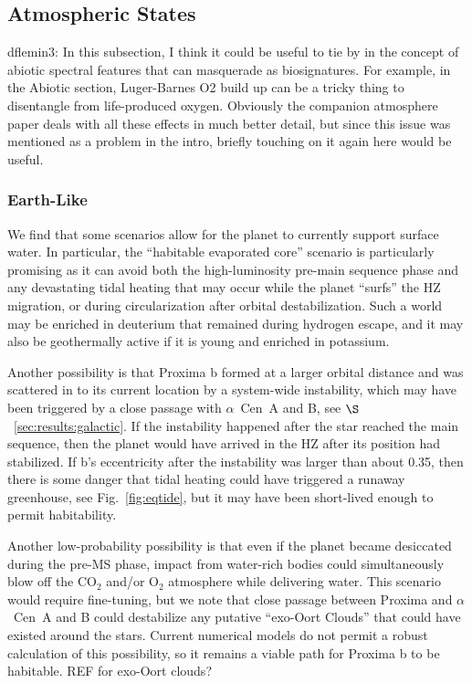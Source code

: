 \documentclass[preprint,12pt]{aastex}
\newcommand{\xxx}[1]{{\color{red} #1}} %
\newcommand{\xxx}[1]{{\color{red} #1}} %
\def\acen{{$\alpha$~Cen}}
\begin{document}
\subsection{Atmospheric States}
\label{sec:results:atmstates}

\xxx{dflemin3:  In this subsection, I think it could be useful to tie by in the concept of abiotic spectral features that can 
masquerade as biosignatures.  For example, in the Abiotic section, Luger-Barnes O2 build up can be a tricky thing to
disentangle from life-produced oxygen.  Obviously the companion atmosphere paper deals with all these effects in much
better detail, but since this issue was mentioned as a problem in the intro, briefly touching on it again here would be useful.}

\subsubsection{Earth-Like}
\label{sec:results:atmstates:earthlike}

We find that some scenarios allow for the planet to currently support
surface water. In particular, the ``habitable evaporated core'' scenario
\citep{Luger15} is particularly promising as it can avoid both the
high-luminosity pre-main sequence phase and any devastating tidal
heating that may occur while the planet ``surfs'' the HZ migration, or
during circularization after orbital destabilization. Such a world may
be enriched in deuterium that remained during \xxx{hydrogen} escape, and it
may also be geothermally active if it is young and enriched in
potassium.

Another possibility is that Proxima b formed at a larger orbital
distance and was scattered in to its current location by a system-wide
instability, which may have been triggered by a close passage with
\acen~A and B, see $\S$~\ref{sec:results:galactic}. If the instability
happened after the star reached the main sequence, then the planet
would have arrived in the HZ after its position had stabilized. If b's
eccentricity after the instability was larger than about 0.35, then
there is some danger that tidal heating could have triggered a runaway
\xxx{greenhouse}, see Fig.~\ref{fig:eqtide}, but it may have been
short-lived enough to permit habitability.

Another low-probability possibility is that even if the planet became
desiccated during the pre-MS phase, impact from water-rich bodies
could simultaneously blow off the CO$_2$ and/or O$_2$ atmosphere while
delivering water. This scenario would require fine-tuning, but we note
that close passage between Proxima and \acen~A and B could destabilize
any putative ``exo-Oort Clouds'' that could have existed around the
stars. Current numerical models do not permit a robust calculation of
this possibility, so it remains a viable path for Proxima b to be
habitable. \xxx{REF for exo-Oort clouds?}
\end{document}
